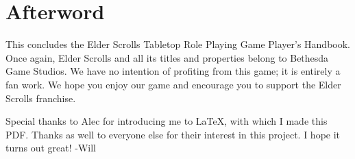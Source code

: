 \documentclass[12pt]{book}
\begin{document}
\chapter*{Afterword}
This concludes the Elder Scrolls Tabletop Role Playing Game Player's Handbook. Once again, Elder Scrolls and all its titles and properties belong to Bethesda Game Studios. We have no intention of profiting from this game; it is entirely a fan work. We hope you enjoy our game and encourage you to support the Elder Scrolls franchise.

Special thanks to Alec for introducing me to LaTeX, with which I made this PDF. Thanks as well to everyone else for their interest in this project. I hope it turns out great! -Will
\end{document}
